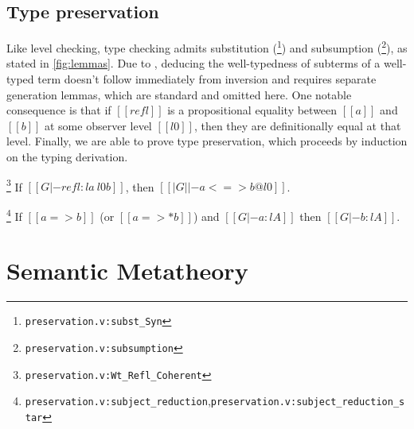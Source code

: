 \documentclass[acmsmall, screen=true, nonacm=true,
  review=\ifpublic false\else true\fi,
  anonymous=\ifanonymous true\else false\fi
]{acmart}
\newcommand{\suppl}[3]{{\scriptsize\texttt{#2:#3}}}
\newlength{\punctwidth}
\newcommand{\stack}[1]{%
  \settowidth{\punctwidth}{#1}%
  \hspace*{-\the\punctwidth}%
}
\begin{document}


\subsection{Type preservation}

Like level checking, type checking admits substitution
(\footnote{\suppl{theories}{preservation.v}{subst\_Syn}})
and subsumption
(\footnote{\suppl{theories}{preservation.v}{subsumption}}),
as stated in \cref{fig:lemmas}.
Due to ,
deducing the well-typedness of subterms of a well-typed term
doesn't follow immediately from inversion and requires separate generation lemmas,
which are standard and omitted here.
One notable consequence is that if $[[refl]]$ is a propositional equality
between $[[a]]$ and $[[b]]$ at some observer level $[[l0]]$,
then they are definitionally equal at that level.
Finally, we are able to prove type preservation,
which proceeds by induction on the typing derivation.

\begin{lemma}
  \stack{.~}\footnote{\suppl{theories}{preservation.v}{Wt\_Refl\_Coherent}}
  If $[[G |- refl : l a ~ l0 b]]$,
  then $[[| G | |- a <=> b @ l0]]$.
\end{lemma}

\begin{theorem}
  \stack{.~}\footnote{\suppl{theories}{preservation.v}{subject\_reduction},\suppl{theories}{preservation.v}{subject\_reduction\_star}}
  \label{thm:preservation}
  If $[[a => b]]$ (or $[[a =>* b]]$) and $[[G |- a : l A]]$
  then $[[G |- b : l A]]$.
\end{theorem}

\section{Semantic Metatheory}
\label{sec:semmeta}
\end{document}
